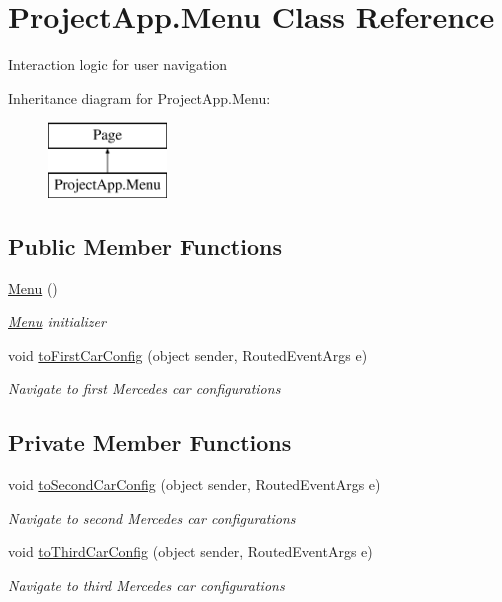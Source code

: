 \hypertarget{class_project_app_1_1_menu}{}\section{Project\+App.\+Menu Class Reference}
\label{class_project_app_1_1_menu}


Interaction logic for user navigation  


Inheritance diagram for Project\+App.\+Menu\+:\begin{figure}[H]
\begin{center}
\leavevmode
\includegraphics[height=2.000000cm]{class_project_app_1_1_menu}
\end{center}
\end{figure}
\subsection*{Public Member Functions}
\begin{DoxyCompactItemize}
\item 
\mbox{\hyperlink{class_project_app_1_1_menu_a09bc96d59ae169d1cb7aa52e0ef0d8f7}{Menu}} ()
\begin{DoxyCompactList}\small\item\em \mbox{\hyperlink{class_project_app_1_1_menu}{Menu}} initializer \end{DoxyCompactList}\item 
void \mbox{\hyperlink{class_project_app_1_1_menu_a7b70ab4645dc11404e398248eda91225}{to\+First\+Car\+Config}} (object sender, Routed\+Event\+Args e)
\begin{DoxyCompactList}\small\item\em Navigate to first Mercedes car configurations \end{DoxyCompactList}\end{DoxyCompactItemize}
\subsection*{Private Member Functions}
\begin{DoxyCompactItemize}
\item 
void \mbox{\hyperlink{class_project_app_1_1_menu_a291218bd9dd354099029bc7e903805e7}{to\+Second\+Car\+Config}} (object sender, Routed\+Event\+Args e)
\begin{DoxyCompactList}\small\item\em Navigate to second Mercedes car configurations \end{DoxyCompactList}\item 
void \mbox{\hyperlink{class_project_app_1_1_menu_a10a17db1b9768e86d56c71cae5f54066}{to\+Third\+Car\+Config}} (object sender, Routed\+Event\+Args e)
\begin{DoxyCompactList}\small\item\em Navigate to third Mercedes car configurations \end{DoxyCompactList}\end{DoxyCompactItemize}


